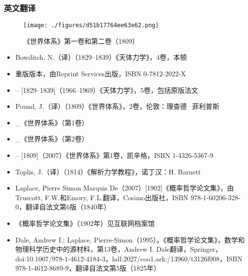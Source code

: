 \subsubsection{英文翻译}
\begin{figure}[ht]
\centering
\texttt{[image: ./figures/d51b17764ee63e62.png]}
\caption{《世界体系》第一卷和第二卷（1809）} \label{fig_LPLS_17}
\end{figure}  
\begin{itemize}
\item Bowditch, N.（译）（1829–1839）《天体力学》，4卷，本顿  
\item 重版版本，由Reprint Services出版，ISBN 0-7812-2022-X  
\item – [1829–1839]（1966–1969）《天体力学》，5卷，包括原版法文  
\item Pound, J.（译）（1809）《世界体系》，2卷，伦敦：理查德·菲利普斯  
\item _《世界体系》（第1卷）  
\item _《世界体系》（第2卷）  
\item – [1809]（2007）《世界体系》第1卷，凯辛格，ISBN 1-4326-5367-9  
\item Toplis, J.（译）（1814）《解析力学教程》，诺丁汉：H. Barnett  
\item Laplace, Pierre Simon Marquis De（2007）[1902]《概率哲学论文集》，由Truscott, F.W.和Emory, F.L.翻译，Cosimo出版社，ISBN 978-1-60206-328-0，翻译自法文第6版（1840年）  
\item 《概率哲学论文集》（1902年）见互联网档案馆  
\item Dale, Andrew I.; Laplace, Pierre-Simon（1995）。《概率哲学论文集》，数学和物理科学历史中的源材料，第13卷，Andrew I. Dale翻译，Springer，doi:10.1007/978-1-4612-4184-3，hdl:2027/coo1.ark:/13960/t3126f008，ISBN 978-1-4612-8689-9，翻译自法文第5版（1825年）
\end{itemize}